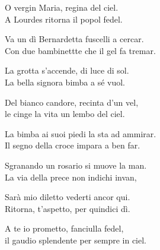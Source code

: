 
\strofa O vergin Maria, regina del ciel.\\
A Lourdes ritorna il popol fedel.

\spazio


\spazio

\strofa Va un dì Bernardetta fuscelli a cercar.\\
Con due bambinettte che il gel fa tremar.

\spazio


\spazio

\strofa La grotta s'accende, di luce di sol.\\
La bella signora bimba a sé vuol.

\spazio


\spazio

\strofa Del bianco candore, recinta d'un vel,\\
le cinge la vita un lembo del ciel.

\spazio


\spazio

\strofa La bimba ai suoi piedi la sta ad ammirar.\\
Il segno della croce impara a ben far.

\spazio


\spazio

\strofa Sgranando un rosario si muove la man.\\
La via della prece non indichi invan,

\spazio


\spazio

\strofa Sarà mio diletto vederti ancor qui.\\
Ritorna, t'aspetto, per quindici dì.

\spazio


\spazio

\strofa A te io prometto, fanciulla fedel,\\
il gaudio splendente per sempre in ciel.

\spazio

